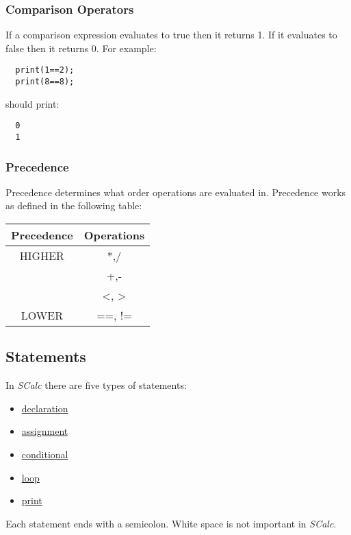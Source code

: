 \documentclass{article}
\begin{document}
\subsubsection{Comparison Operators}
If a comparison expression evaluates to true then it returns 1. If it evaluates to false then it
returns 0. For example:
\begin{lstlisting}
  print(1==2);
  print(8==8);
\end{lstlisting}
should print:
\begin{lstlisting}
  0
  1
\end{lstlisting}

\subsubsection{Precedence}
Precedence determines what order operations are evaluated in. Precedence works as defined in the
following table:
\begin{center}
  \begin{tabular}{|c|c|}
  \hline
  \textbf{Precedence} & \textbf{Operations} \\
  \hline
  HIGHER
  & *,/ \\
  & +,- \\
  & <, > \\
  LOWER & ==, != \\
  \hline
  \end{tabular}
\end{center}

\subsection {Statements}

In \textit{SCalc} there are five types of statements:

\begin {itemize}
  \item \hyperref[sssec:declaration]{declaration}
  \item \hyperref[sssec:assignment]{assignment}
  \item \hyperref[sssec:conditional]{conditional}
  \item \hyperref[sssec:loop]{loop}
  \item \hyperref[sssec:print]{print}

\end {itemize}

Each statement ends with a semicolon. White space is not important in \textit{SCalc}.
\end{document}
